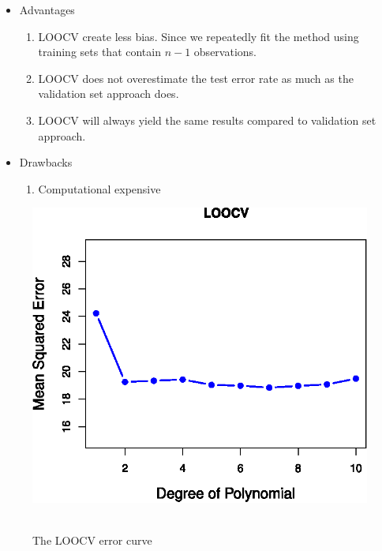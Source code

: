 \documentclass[12pt,a4paper]{article}%
\theoremstyle{definition}
\theoremstyle{plain}
\numberwithin{equation}{section}
\begin{document}
\begin{itemize}
\item Advantages
	\begin{enumerate}
	\item LOOCV create less bias. Since we repeatedly fit the method using training sets that contain $n-1$ observations.
	\item LOOCV does not overestimate the test error rate as much as the validation set approach does. 
	\item LOOCV will always yield the same results compared to validation set approach.
	\end{enumerate}
\end{itemize}

\begin{itemize}
\item Drawbacks
	\begin{enumerate}
	\item Computational expensive
	\end{enumerate}
\end{itemize}

\begin{figure}[H]
\centering
\includegraphics[scale=1]{images//5_4.eps}
\\~\\
\caption{The LOOCV error curve}\label{figure-5.4}
\end{figure}
\end{document}
